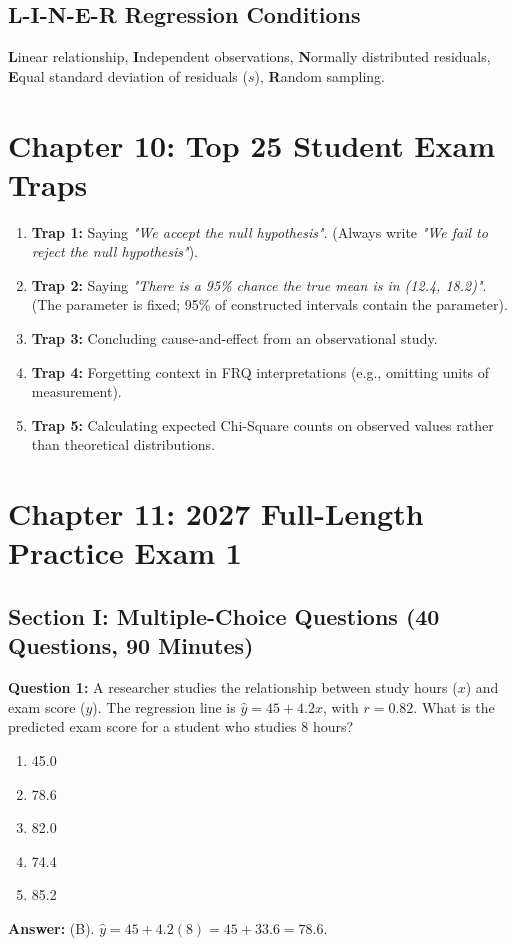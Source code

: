 \documentclass[11pt,oneside,openany]{book}
\begin{document}
\section{L-I-N-E-R Regression Conditions}
\textbf{L}inear relationship, \textbf{I}ndependent observations, \textbf{N}ormally distributed residuals, \textbf{E}qual standard deviation of residuals ($s$), \textbf{R}andom sampling.

\chapter{Chapter 10: Top 25 Student Exam Traps}
\begin{enumerate}[leftmargin=1.5em]
  \item \textbf{Trap 1:} Saying \textit{"We accept the null hypothesis"}. (Always write \textit{"We fail to reject the null hypothesis"}).
  \item \textbf{Trap 2:} Saying \textit{"There is a 95\% chance the true mean is in (12.4, 18.2)"}. (The parameter is fixed; 95\% of constructed intervals contain the parameter).
  \item \textbf{Trap 3:} Concluding cause-and-effect from an observational study.
  \item \textbf{Trap 4:} Forgetting context in FRQ interpretations (e.g., omitting units of measurement).
  \item \textbf{Trap 5:} Calculating expected Chi-Square counts on observed values rather than theoretical distributions.
\end{enumerate}

\chapter{Chapter 11: 2027 Full-Length Practice Exam 1}
\section*{Section I: Multiple-Choice Questions (40 Questions, 90 Minutes)}
\textbf{Question 1:} A researcher studies the relationship between study hours ($x$) and exam score ($y$). The regression line is $\hat{y} = 45 + 4.2x$, with $r = 0.82$. What is the predicted exam score for a student who studies 8 hours?
\begin{enumerate}[label=(\Alph*)]
  \item 45.0
  \item 78.6
  \item 82.0
  \item 74.4
  \item 85.2
\end{enumerate}
\textbf{Answer:} (B). $\hat{y} = 45 + 4.2(8) = 45 + 33.6 = 78.6$.
\end{document}
